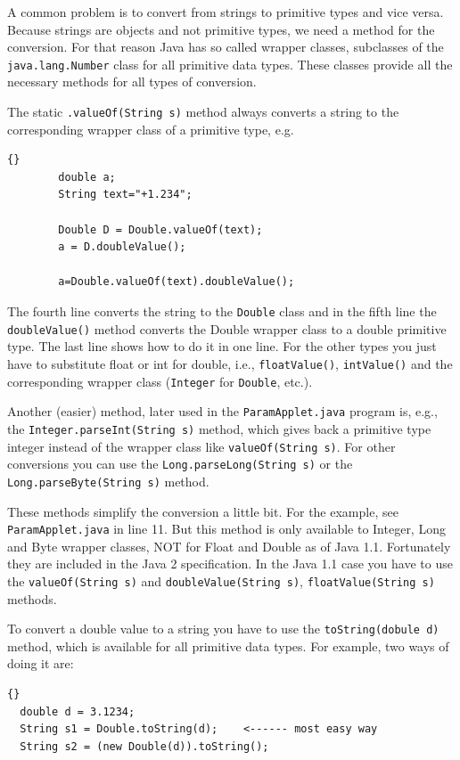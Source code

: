 A common problem is to convert from strings to primitive types and
vice versa. Because strings are objects and not primitive types, we
need a method for the conversion. For that reason Java has so called
wrapper classes, subclasses of the \verb|java.lang.Number| class 
for all primitive data types. 
These classes provide all the necessary methods for all types of
conversion. 

The static \verb|.valueOf(String s)| method always converts a string
to the corresponding wrapper class of a primitive type, e.g. 
\begin{lstlisting}{}
        double a;
        String text="+1.234";

        Double D = Double.valueOf(text);
        a = D.doubleValue();

        a=Double.valueOf(text).doubleValue();
\end{lstlisting}
The fourth line converts the string to the \verb|Double| class and in the
fifth line 
the \verb|doubleValue()| method converts the Double wrapper class 
to a double primitive type. The last line shows how to do it in
one line.
For the other types you just have to substitute float or int 
for double, i.e., \verb|floatValue()|, \verb|intValue()| and the
corresponding wrapper class (\verb|Integer| for \verb|Double|, etc.).
 
Another (easier) method, 
later used in the \verb|ParamApplet.java| program is, e.g.,
the \verb|Integer.parseInt(String s)| method, which gives back a primitive
type integer instead of the wrapper class like \verb|valueOf(String s)|.
For other conversions you can use the \verb|Long.parseLong(String s)| or the
\verb|Long.parseByte(String s)| method.

These methods  simplify the conversion a little bit. For the example, see
\verb|ParamApplet.java| in line 11. But this method is only 
available to Integer, Long and Byte wrapper classes, NOT for
Float and Double as of Java 1.1. Fortunately they are included in the
Java 2 specification.
In the Java 1.1 case you have to use the \verb|valueOf(String s)| and
\verb|doubleValue(String s)|, \verb|floatValue(String s)| methods.

To convert a double value to a string you have to use the \verb|toString(dobule d)|
method, which is available for all primitive data types.
For example, two ways of doing it are:
\begin{lstlisting}{}
  double d = 3.1234;
  String s1 = Double.toString(d);    <------ most easy way
  String s2 = (new Double(d)).toString();
\end{lstlisting} 



